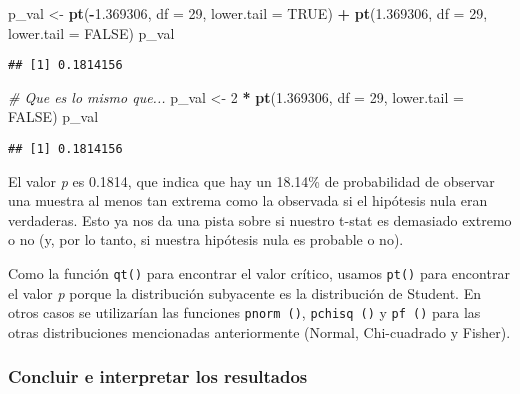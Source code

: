 \documentclass[
]{book}
\newenvironment{Shaded}{\begin{snugshade}}{\end{snugshade}}
\newcommand{\CommentTok}[1]{\textcolor[rgb]{0.56,0.35,0.01}{\textit{#1}}}
\newcommand{\DataTypeTok}[1]{\textcolor[rgb]{0.13,0.29,0.53}{#1}}
\newcommand{\DecValTok}[1]{\textcolor[rgb]{0.00,0.00,0.81}{#1}}
\newcommand{\FloatTok}[1]{\textcolor[rgb]{0.00,0.00,0.81}{#1}}
\newcommand{\KeywordTok}[1]{\textcolor[rgb]{0.13,0.29,0.53}{\textbf{#1}}}
\newcommand{\NormalTok}[1]{#1}
\newcommand{\OperatorTok}[1]{\textcolor[rgb]{0.81,0.36,0.00}{\textbf{#1}}}
\newcommand{\OtherTok}[1]{\textcolor[rgb]{0.56,0.35,0.01}{#1}}
\newcommand{\StringTok}[1]{\textcolor[rgb]{0.31,0.60,0.02}{#1}}
\begin{document}
\begin{Shaded}
\begin{Highlighting}[]
\NormalTok{p_val <-}\StringTok{ }\KeywordTok{pt}\NormalTok{(}\OperatorTok{-}\FloatTok{1.369306}\NormalTok{, }\DataTypeTok{df =} \DecValTok{29}\NormalTok{, }\DataTypeTok{lower.tail =} \OtherTok{TRUE}\NormalTok{) }\OperatorTok{+}\StringTok{ }\KeywordTok{pt}\NormalTok{(}\FloatTok{1.369306}\NormalTok{, }\DataTypeTok{df =} \DecValTok{29}\NormalTok{, }\DataTypeTok{lower.tail =} \OtherTok{FALSE}\NormalTok{)}
\NormalTok{p_val}
\end{Highlighting}
\end{Shaded}

\begin{verbatim}
## [1] 0.1814156
\end{verbatim}

\begin{Shaded}
\begin{Highlighting}[]
\CommentTok{# Que es lo mismo que...}
\NormalTok{p_val <-}\StringTok{ }\DecValTok{2} \OperatorTok{*}\StringTok{ }\KeywordTok{pt}\NormalTok{(}\FloatTok{1.369306}\NormalTok{, }\DataTypeTok{df =} \DecValTok{29}\NormalTok{, }\DataTypeTok{lower.tail =} \OtherTok{FALSE}\NormalTok{)}
\NormalTok{p_val}
\end{Highlighting}
\end{Shaded}

\begin{verbatim}
## [1] 0.1814156
\end{verbatim}

El valor \emph{p} es 0.1814, que indica que hay un 18.14\% de probabilidad de observar una muestra al menos tan extrema como la observada si el hipótesis nula eran verdaderas. Esto ya nos da una pista sobre si nuestro t-stat es demasiado extremo o no (y, por lo tanto, si nuestra hipótesis nula es probable o no).

Como la función \texttt{qt()} para encontrar el valor crítico, usamos \texttt{pt()} para encontrar el valor \emph{p} porque la distribución subyacente es la distribución de Student. En otros casos se utilizarían las funciones \texttt{pnorm\ ()}, \texttt{pchisq\ ()} y \texttt{pf\ ()} para las otras distribuciones mencionadas anteriormente (Normal, Chi-cuadrado y Fisher).

\hypertarget{concluir-e-interpretar-los-resultados}{%
\subsubsection{Concluir e interpretar los resultados}\label{concluir-e-interpretar-los-resultados}}
\end{document}

